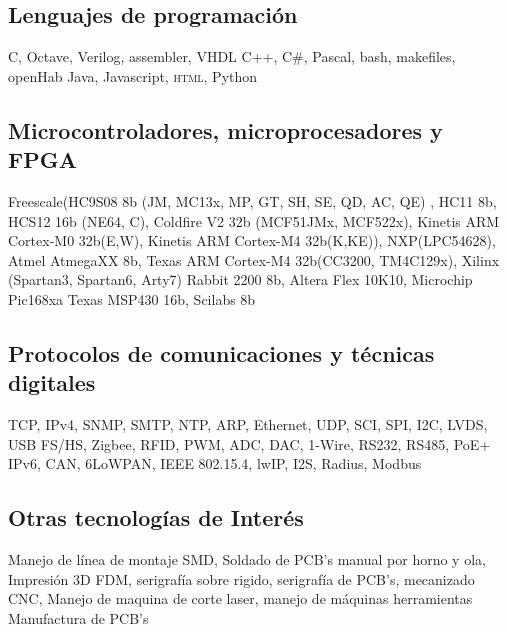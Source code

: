 \documentclass[11pt,a4paper,sans]{moderncv}  %
\begin{document}
   \subsection{Lenguajes de programación}
      { C, Octave, Verilog, assembler, VHDL}
    { C++, C\#,  Pascal, bash, makefiles, openHab}
        { Java, Javascript, \textsc { html}, Python}

   \subsection{Microcontroladores, microprocesadores y FPGA}
      { Freescale(HC9S08 8b (JM, MC13x, MP, GT, SH, SE, QD, AC, QE) , HC11 8b, HCS12 16b (NE64, C), Coldfire V2 32b (MCF51JMx, MCF522x), Kinetis ARM Cortex-M0 32b(E,W), Kinetis ARM Cortex-M4 32b(K,KE)), NXP(LPC54628), Atmel AtmegaXX 8b, Texas ARM Cortex-M4 32b(CC3200, TM4C129x), Xilinx (Spartan3, Spartan6, Arty7)}
    { Rabbit 2200 8b, Altera Flex 10K10, Microchip Pic168xa}
        { Texas MSP430 16b, Scilabs 8b}

   \subsection{Protocolos de comunicaciones y técnicas digitales}
       {TCP, IPv4, SNMP, SMTP, NTP, ARP, Ethernet, UDP, SCI, SPI, I2C, LVDS, USB FS/HS, Zigbee, RFID, PWM, ADC, DAC, 1-Wire, RS232, RS485, PoE+}
     {IPv6, CAN, 6LoWPAN, IEEE 802.15.4, lwIP, I2S, Radius, Modbus}
      {}
   
   \subsection{Otras tecnologías de Interés}
       {Manejo de línea de montaje SMD, Soldado de PCB's manual por horno y ola, Impresión 3D FDM, serigrafía sobre rigido, serigrafía de PCB's,  mecanizado CNC, Manejo de maquina de corte laser, manejo de máquinas herramientas}
     {Manufactura de PCB's}
      {}

\end{document}
